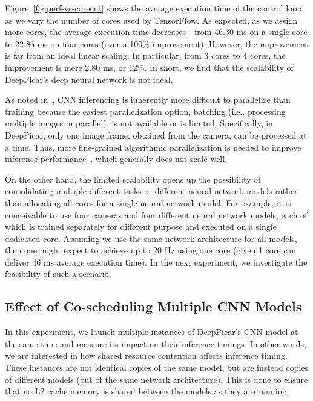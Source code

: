 Figure~\ref{fig:perf-vs-corecnt} shows the average execution time of
the control loop as we vary the number of cores used by
TensorFlow. As expected, as we assign more cores, the average execution
time decreases---from 46.30 ms on a single core to 22.86 ms on four
cores (over a 100\% improvement). However, the improvement is far from an ideal
linear scaling. In particular, from 3 cores to 4 cores, the
improvement is mere 2.80 ms, or 12\%. In short, we find that the
scalability of DeepPicar's deep neural network is not ideal.

As noted in~\cite{NVIDIA2015}, CNN inferencing is inherently more
difficult to parallelize than training because the easiest
parallelization option, batching (i.e., processing multiple images in
parallel), is not available or is limited. Specifically, in DeepPicar,
only one image frame, obtained from the camera, can be processed at a
time. Thus, more fine-grained algorithmic parallelization is needed to
improve inference performance~\cite{NVIDIA2015}, which generally does
not scale well. 

On the other hand, the limited scalability opens up the possibility of
consolidating multiple different tasks or different neural network
models rather than allocating all cores for a single neural network
model.
For example, it is conceivable to use four cameras and four different
neural network models, each of which is trained separately for
different purpose and executed on a single dedicated core.
Assuming we use the same network
architecture for all models, then one might expect to achieve up to
20 Hz using one core (given 1 core can deliver 46 ms average
execution time).
In the next experiment, we investigate the
feasibility of such a scenario.

\subsection{Effect of Co-scheduling Multiple CNN Models}

In this experiment, we launch multiple instances of DeepPicar's CNN
model at the same time and measure its impact on their inference
timings. In other words, we are interested in how shared resource
contention affects inference timing. These instances are not identical
copies of the same model, but are instead copies of different models
(but of the same network architecture). 
This is done to ensure that no L2 cache memory is shared between the 
models as they are running.

